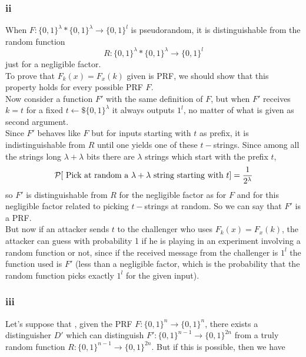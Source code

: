 \documentclass[11pt]{article}
\newcounter{t0d0_counter}
\begin{document}
\subsubsection{ii}
When $F:\{0,1\}^{\lambda}*\{0,1\}^{\lambda} \to \{0,1\}^{l} $ is pseudorandom,
it is distinguishable from the random function
\[
R:\{0,1\}^{\lambda} * \{0,1\}^{\lambda} \to \{0,1\}^{l} 
\]
just for a negligible factor.\\

To prove that $F_{k}(x)=F_{x}(k)$ given is PRF, we should show that
this property holds for every possible PRF $F$.\\
Now consider a function $F'$ with the same definition of $F$, but when $F'$
receives $k=t$ for a fixed $t \leftarrow\$ \{0,1\}^{\lambda} $ it always outputs
$1^{l}$, no matter of what is given as second argument.\\

Since $F'$ behaves like $F$ but for inputs starting with $t$ as prefix, it is
indistinguishable from $R$ until one yields one of these $t-$strings.
Since among all the strings long $\lambda + \lambda$ bits there are $\lambda$
strings which start with the prefix $t$, 
\[
    \P [ \text{ Pick at random a $\lambda + \lambda$ string starting with $t$}
    ]= \frac{1}{2^{\lambda}}  
\]
so $F'$ is distinguishable from $R$ for the negligible factor as for $F$ and for
this negligible factor related to picking $t-$strings at random.
So we can say that $F'$ is a PRF.\\

But now if an attacker sends $t$ to the challenger who uses $F_{k}(x)=F_{x}(k)$,
the attacker can guess with probability 1 if he is playing in an experiment
involving a random function or not, since if the received message from the
challenger is $1^{l}$ the function used is $F'$ (less than a negligible factor,
which is the probability that the random function picks exactly $1^{l}$ for the
given input).
\newpage
\subsubsection{iii}
Let's suppose that , given the PRF $F:\{0,1\}^{n} \to \{0,1\}^{n}$, there
exists a distinguisher $D'$ which can distinguish $F':\{0,1\}^{n-1} \to
\{0,1\}^{2n} $ from a truly random function $R:\{0,1\}^{n-1} \to
\{0,1\}^{2n} $.
But if this is possible, then we have 
\end{document}
